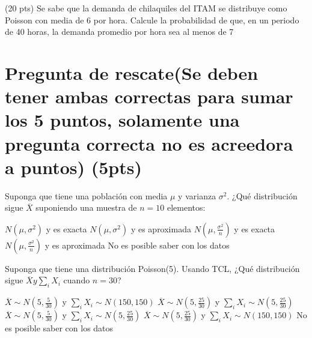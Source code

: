 \documentclass[addpoints]{exam}
\theoremstyle{mytheor}
\begin{document}
\begin{questions}
  \question (20 pts) 
  Se sabe que la demanda de chilaquiles del ITAM se distribuye como Poisson con media de 6 por hora. Calcule la probabilidad de que, en un periodo de 40 horas, la demanda promedio por hora sea al menos de 7

  \end{questions}
  
  
  
  \section*{Pregunta de rescate(Se deben tener ambas correctas para sumar los 5 puntos, solamente una pregunta correcta no es acreedora a puntos) (5pts)}
  
  \begin{questions}
  \question Suponga que tiene una población con media $\mu$ y varianza $\sigma^2$. ¿Qué distribución sigue $\overline{X}$ suponiendo una muestra de $n = 10$ elementos:
  
  \begin{checkboxes}
  \choice $N(\mu, \sigma^2)$ y es exacta
  \choice $N(\mu, \sigma^2)$ y es aproximada
  \choice $N(\mu, \frac{\sigma^2}{n})$ y es exacta
  \choice $N(\mu, \frac{\sigma^2}{n})$ y es aproximada
  \choice No es posible saber con los datos
  \end{checkboxes}
    
  \question Suponga que tiene una distribución Poisson(5). Usando TCL, ¿Qué distribución sigue $\overline{X} y \sum_i X_i$ cuando $n=30$?
  
  \begin{checkboxes}
  \choice $\overline{X} \sim N(5,\frac{5}{30})$ y $\sum_i X_i \sim N(150, 150)$
  \choice $\overline{X} \sim N(5,\frac{25}{30})$ y $\sum_i X_i \sim N(5, \frac{25}{30})$
  \choice $\overline{X} \sim N(5,\frac{5}{30})$ y $\sum_i X_i \sim N(5, \frac{25}{30})$
  \choice $\overline{X} \sim N(5,\frac{25}{30})$ y $\sum_i X_i \sim N(150, 150)$
  \choice No es posible saber con los datos
  \end{checkboxes}
  

  
  \end{questions}
  
  
  
  
\end{document}
